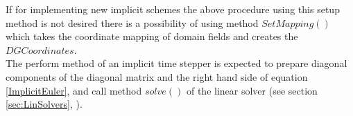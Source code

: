 \documentclass[BoSSSForSolvingConservationLaws.tex]{subfiles}
\begin{document}
If for implementing new implicit schemes the above procedure using this setup method is not desired there is a possibility of using method $SetMapping()$ which takes the coordinate mapping of domain fields and creates the $DGCoordinates$.\\
The perform method of an implicit time stepper is expected to prepare diagonal components of the diagonal matrix and the right hand side of equation \eqref{ImplicitEuler}, and call method $solve()$ of the linear solver (see section \ref{sec:LinSolvers}, ).
\end{document}
